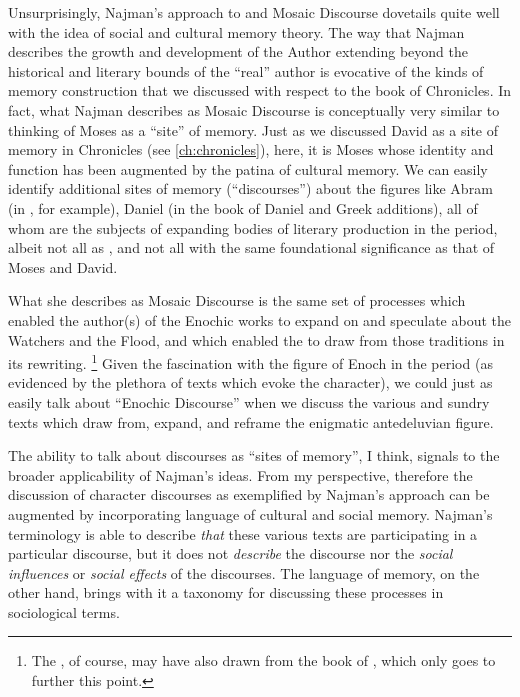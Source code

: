 Unsurprisingly, Najman's approach to \jub and Mosaic Discourse dovetails quite well with the idea of social and cultural memory theory. The way that Najman describes the growth and development of the Author extending beyond the historical and literary bounds of the ``real'' author is evocative of the kinds of memory construction that we discussed with respect to the book of Chronicles. In fact, what Najman describes as Mosaic Discourse is conceptually very similar to thinking of Moses as a ``site'' of memory. Just as we discussed David as a site of memory in Chronicles (see \ref{ch:chronicles}), here, it is Moses whose identity and function has been augmented by the patina of cultural memory. We can easily identify additional sites of memory (``discourses'') about the figures like Abram (in \ga, for example), Daniel (in the book of Daniel and Greek additions), all of whom are the subjects of expanding bodies of literary production in the \secondtemple period, albeit not all as \psa, and not all with the same foundational significance as that of Moses and David.

What she describes as Mosaic Discourse is the same set of processes which enabled the author(s) of the Enochic works to expand on and speculate about the Watchers and the Flood, and which enabled the \ga to draw from those traditions in its rewriting.%
    \footnote{The \ga, of course, may have also drawn from the book of \jub, which only goes to further this point.}
Given the fascination with the figure of Enoch in the \secondtemple period (as evidenced by the plethora of texts which evoke the character), we could just as easily talk about ``Enochic Discourse'' when we discuss the various and sundry texts which draw from, expand, and reframe the enigmatic antedeluvian figure.

The ability to talk about discourses as ``sites of memory'', I think, signals to the broader applicability of Najman's ideas. From my perspective, therefore the discussion of character discourses as exemplified by Najman's approach can be augmented by incorporating language of cultural and social memory. Najman's terminology is able to describe \emph{that} these various texts are participating in a particular discourse, but it does not \emph{describe} the discourse nor the \emph{social influences} or \emph{social effects} of the discourses. The language of memory, on the other hand, brings with it a taxonomy for discussing these processes in sociological terms.

